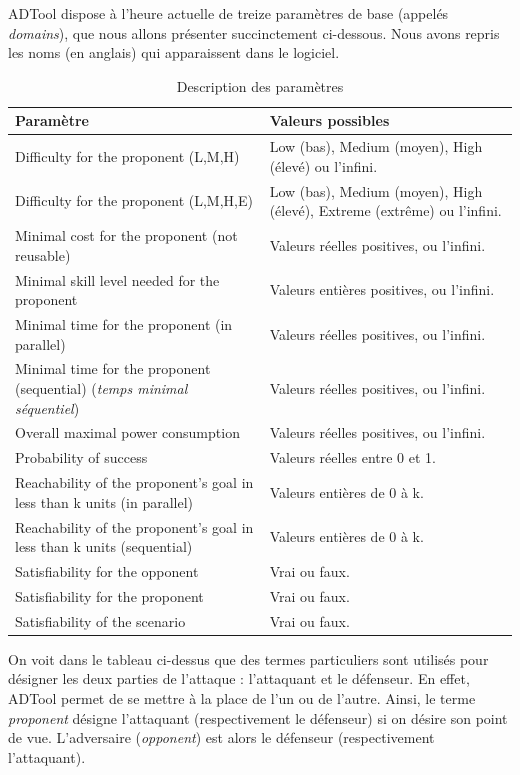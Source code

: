 ADTool dispose à l'heure actuelle de treize paramètres de base (appelés \textit{domains}), que nous allons présenter succinctement ci-dessous. Nous avons repris les noms (en anglais) qui apparaissent dans le logiciel. 
		
\begin{table}[!h]
	\centering
	\begin{tabular}{|p{6cm}|p{5cm}|}
  \hline
  \textbf{Paramètre} & \textbf{Valeurs possibles} \\
  \hline
  Difficulty for the proponent (L,M,H) & 
 Low (bas), Medium (moyen), High (élevé) ou l'infini.
\\ \hline
Difficulty for the proponent (L,M,H,E) & 
Low (bas), Medium (moyen), High (élevé), Extreme (extrême) ou l'infini.
\\ \hline
Minimal cost for the proponent (not reusable) & 
Valeurs réelles positives, ou l'infini.\\ \hline
  Minimal skill level needed for the proponent
  & Valeurs entières positives, ou l'infini.\\ \hline
  Minimal time for the proponent (in parallel)
  & Valeurs réelles positives, ou l'infini.\\ \hline
  Minimal time for the proponent (sequential) (\textit{temps minimal séquentiel})
  & Valeurs réelles positives, ou l'infini.\\ \hline
  Overall maximal power consumption & 
  Valeurs réelles positives, ou l'infini.\\ \hline
  Probability of success &
  Valeurs réelles entre 0 et 1.\\ \hline
  Reachability of the proponent's goal in less than k units (in parallel)
  & Valeurs entières de 0 à k. \\ \hline
  Reachability of the proponent's goal in less than k units (sequential)
  & Valeurs entières de 0 à k. \\ \hline
  Satisfiability for the opponent
  & Vrai ou faux. \\ \hline
  Satisfiability for the proponent
  & Vrai ou faux. \\ \hline
  Satisfiability of the scenario
  & Vrai ou faux. \\
  \hline
\end{tabular}
	\caption{Description des paramètres}
	\label{tab:DescriptionParam}
\end{table}

On voit dans le tableau ci-dessus que des termes particuliers sont utilisés pour désigner les deux parties de l'attaque : l'attaquant et le défenseur. En effet, ADTool permet de se mettre à la place de l'un ou de l'autre. Ainsi, le terme \textit{proponent} désigne l'attaquant (respectivement le défenseur) si on désire son point de vue. L'adversaire (\textit{opponent}) est alors le défenseur (respectivement l'attaquant). %

